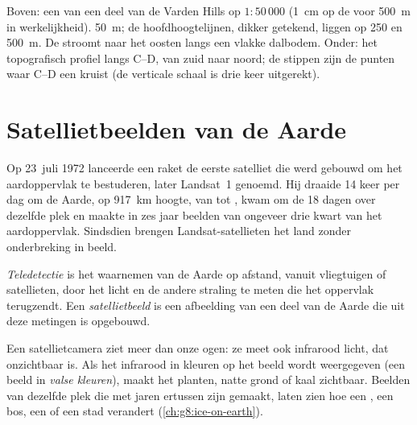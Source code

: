 \begin{omfigure}
{\small Boven: een  van een deel van de Varden Hills op
$1 : 50\,000$ (1~cm op de  voor \qty{500}{m} in werkelijkheid).
 \qty{50}{m}; de hoofdhoogtelijnen, dikker getekend, liggen
op 250 en \qty{500}{m}. De  stroomt naar het oosten langs een vlakke
dalbodem. Onder: het topografisch profiel langs C--D, van zuid naar noord;
de stippen zijn de punten waar C--D een  kruist (de verticale
schaal is drie keer uitgerekt).}
\label{fig:g9:maps-of-the-earth:topo}
\end{omfigure}

\section{Satellietbeelden van de Aarde}

Op 23~juli 1972 lanceerde een raket de eerste satelliet die werd gebouwd om
het aardoppervlak te bestuderen, later Landsat~1 genoemd. Hij draaide
14 keer per dag om de Aarde, op \qty{917}{km} hoogte, van  tot ,
kwam om de 18 dagen over dezelfde plek en maakte in zes jaar beelden van
ongeveer drie kwart van het aardoppervlak. Sindsdien brengen
Landsat-satellieten het land zonder onderbreking in beeld.

\begin{definition}\label{def:g9:maps-of-the-earth:remote-sensing}
\emph{Teledetectie} is het waarnemen van de Aarde op
afstand, vanuit vliegtuigen of satellieten, door het licht en de andere
straling te meten die het oppervlak terugzendt. Een
\emph{satellietbeeld} is een afbeelding van een deel
van de Aarde die uit deze metingen is opgebouwd.
\end{definition}

Een satellietcamera ziet meer dan onze ogen: ze meet ook infrarood licht,
dat onzichtbaar is. Als het infrarood in kleuren op het beeld wordt
weergegeven (een beeld in \emph{valse kleuren}), maakt het planten, natte
grond of kaal  zichtbaar. Beelden van dezelfde plek die met jaren
ertussen zijn gemaakt, laten zien hoe een , een bos, een  of
een stad verandert (\cref{ch:g8:ice-on-earth}).

